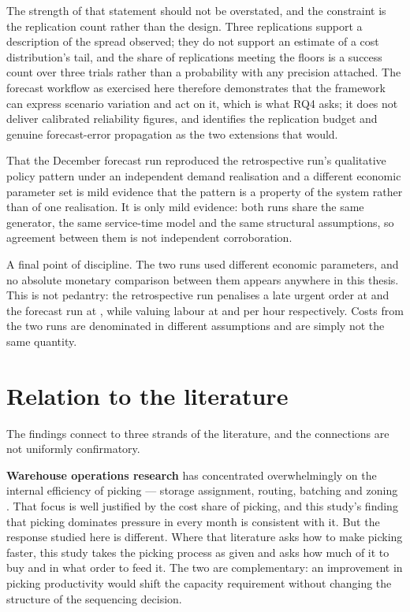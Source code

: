 The strength of that statement should not be overstated, and the constraint is the replication
count rather than the design. Three replications support a description of the spread observed;
they do not support an estimate of a cost distribution's tail, and the share of replications
meeting the floors is a success count over three trials rather than a probability with any
precision attached. The forecast workflow as exercised here therefore demonstrates that the
framework can express scenario variation and act on it, which is what RQ4 asks; it does not
deliver calibrated reliability figures, and  identifies the replication
budget and genuine forecast-error propagation as the two extensions that would.

That the December forecast run reproduced the retrospective run's qualitative policy pattern
under an independent demand realisation and a different economic parameter set is mild evidence
that the pattern is a property of the system rather than of one realisation. It is only mild
evidence: both runs share the same generator, the same service-time model and the same
structural assumptions, so agreement between them is not independent corroboration.

A final point of discipline. The two runs used different economic parameters, and no absolute
monetary comparison between them appears anywhere in this thesis. This is not pedantry: the
retrospective run penalises a late urgent order at  and the forecast run at ,
while valuing labour at  and  per hour respectively. Costs from the two runs are
denominated in different assumptions and are simply not the same quantity.

\section{Relation to the literature}
\label{sec:disc-literature}

The findings connect to three strands of the literature, and the connections are not uniformly
confirmatory.

\textbf{Warehouse operations research} has concentrated overwhelmingly on the internal
efficiency of picking --- storage assignment, routing, batching and zoning
\citep{dekoster2007,gu2007,vangils2018}. That focus is well justified by the cost share of
picking, and this study's finding that picking dominates pressure in every month is consistent
with it. But the response studied here is different. Where that literature asks how to make
picking faster, this study takes the picking process as given and asks how much of it to buy
and in what order to feed it. The two are complementary: an improvement in picking productivity
would shift the capacity requirement without changing the structure of the sequencing decision.

